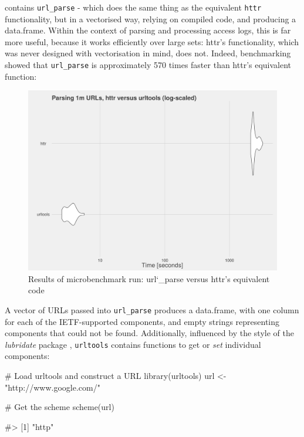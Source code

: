  contains \texttt{url\_parse} - which does the same
thing as the equivalent \texttt{httr} functionality, but in a vectorised
way, relying on compiled code, and producing a data.frame. Within the
context of parsing and processing access logs, this is far more useful,
because it works efficiently over large sets: httr's functionality,
which was never designed with vectorisation in mind, does not. Indeed,
benchmarking showed that \texttt{url\_parse} is approximately 570 times
faster than httr's equivalent function:

\begin{figure}[h]
    \centering
    \includegraphics[scale=0.4]{parsing_benchmarks}
    \caption{Results of microbenchmark run: url\char`_parse versus httr's equivalent code}
\end{figure}

\newpage

A vector of URLs passed into \texttt{url\_parse} produces a data.frame,
with one column for each of the IETF-supported components, and empty
strings representing components that could not be found. Additionally,
influenced by the style of the \emph{lubridate} package
\citep{lubridate}, \texttt{urltools} contains functions to get or
\emph{set} individual components:

\begin{Schunk}
\begin{Sinput}
# Load urltools and construct a URL
library(urltools)
url <- "http://www.google.com/"

# Get the scheme
scheme(url)
\end{Sinput}
\begin{Soutput}
#> [1] "http"
\end{Soutput}
\end{Schunk}

